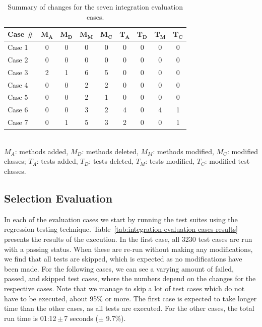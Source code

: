 \documentclass[a4paper,english,12pt]{report}
\begin{document}
\begin{table}[htbp]
  \centering
  \begin{tabular}{|l|c|c|c|c|c|c|c|c|}
    \hline
    \textbf{Case \#} & $\boldsymbol{M_A}$ & $\boldsymbol{M_D}$ & $\boldsymbol{M_M}$ & $\boldsymbol{M_C}$ & $\boldsymbol{T_A}$ & $\boldsymbol{T_D}$ & $\boldsymbol{T_M}$ & $\boldsymbol{T_C}$\\
    \hline
    Case 1 & 0 & 0 & 0 & 0 & 0 & 0 & 0 & 0\\
    \hline
    Case 2 & 0 & 0 & 0 & 0 & 0 & 0 & 0 & 0\\
    \hline
    Case 3 & 2 & 1 & 6 & 5 & 0 & 0 & 0 & 0\\
    \hline
    Case 4 & 0 & 0 & 2 & 2 & 0 & 0 & 0 & 0\\
    \hline
    Case 5 & 0 & 0 & 2 & 1 & 0 & 0 & 0 & 0\\
    \hline
    Case 6 & 0 & 0 & 3 & 2 & 4 & 0 & 4 & 1\\
    \hline
    Case 7 & 0 & 1 & 5 & 3 & 2 & 0 & 0 & 1\\
    \hline
  \end{tabular}
  {\\[2ex]\footnotesize$M_A$: methods added, $M_D$: methods deleted, $M_M$: methods modified, $M_C$: modified classes; $T_A$: tests added, $T_D$: tests deleted, $T_M$: tests modified, $T_C$: modified test classes.}
  \caption{Summary of changes for the seven integration evaluation cases.}
  \label{tab:integration-evaluation-cases-changes}
\end{table}

\subsection{Selection Evaluation}\label{sec:selection-evaluation}
In each of the evaluation cases we start by running the test suites using the regression testing technique. Table~\vref{tab:integration-evaluation-cases-results} presents the results of the execution. In the first case, all 3230 test cases are run with a passing status. When these are re-run without making any modifications, we find that all tests are skipped, which is expected as no modifications have been made. For the following cases, we can see a varying amount of failed, passed, and skipped test cases, where the numbers depend on the changes for the respective cases. Note that we manage to skip a lot of test cases which do not have to be executed, about 95\% or more. The first case is expected to take longer time than the other cases, as all tests are executed. For the other cases, the total run time is 01:12\,$\pm$\,7 seconds ($\pm$ 9.7\%).
\end{document}
